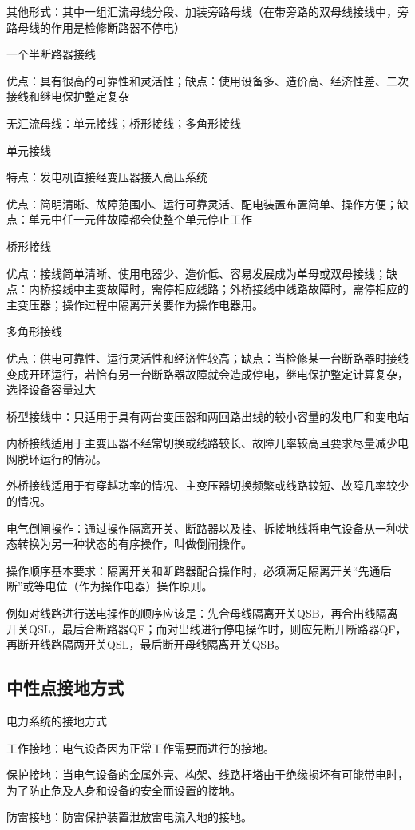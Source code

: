 \documentclass[UTF8, 12pt, a4paper]{ctexart}
\begin{document}
其他形式：其中一组汇流母线分段、加装旁路母线（在带旁路的双母线接线中，旁路母线的作用是检修断路器不停电）

一个半断路器接线

优点：具有很高的可靠性和灵活性；缺点：使用设备多、造价高、经济性差、二次接线和继电保护整定复杂

无汇流母线：单元接线；桥形接线；多角形接线

单元接线

特点：发电机直接经变压器接入高压系统

优点：简明清晰、故障范围小、运行可靠灵活、配电装置布置简单、操作方便；缺点：单元中任一元件故障都会使整个单元停止工作

桥形接线

优点：接线简单清晰、使用电器少、造价低、容易发展成为单母或双母接线；缺点：内桥接线中主变故障时，需停相应线路；外桥接线中线路故障时，需停相应的主变压器；操作过程中隔离开关要作为操作电器用。

多角形接线

优点：供电可靠性、运行灵活性和经济性较高；缺点：当检修某一台断路器时接线变成开环运行，若恰有另一台断路器故障就会造成停电，继电保护整定计算复杂，选择设备容量过大

桥型接线中：只适用于具有两台变压器和两回路出线的较小容量的发电厂和变电站

内桥接线适用于主变压器不经常切换或线路较长、故障几率较高且要求尽量减少电网脱环运行的情况。

外桥接线适用于有穿越功率的情况、主变压器切换频繁或线路较短、故障几率较少的情况。

电气倒闸操作：通过操作隔离开关、断路器以及挂、拆接地线将电气设备从一种状态转换为另一种状态的有序操作，叫做倒闸操作。

操作顺序基本要求：隔离开关和断路器配合操作时，必须满足隔离开关“先通后断”或等电位（作为操作电器）操作原则。

例如对线路进行送电操作的顺序应该是：先合母线隔离开关QSB，再合出线隔离开关QSL，最后合断路器QF；而对出线进行停电操作时，则应先断开断路器QF，再断开线路隔两开关QSL，最后断开母线隔离开关QSB。
\subsection{中性点接地方式}
电力系统的接地方式

工作接地：电气设备因为正常工作需要而进行的接地。

保护接地：当电气设备的金属外壳、构架、线路杆塔由于绝缘损坏有可能带电时，为了防止危及人身和设备的安全而设置的接地。

防雷接地：防雷保护装置泄放雷电流入地的接地。
\end{document}
